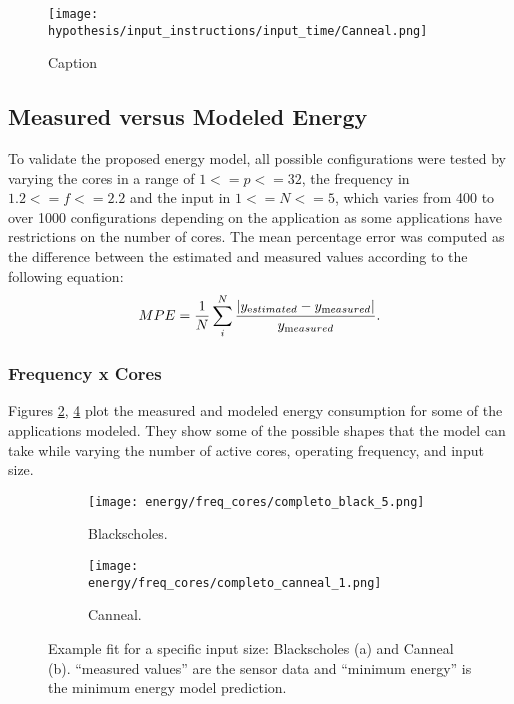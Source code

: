 \documentclass{ieeeaccess}
\begin{document}
\begin{figure}[H]
    \centering
    \texttt{[image: hypothesis/input\_instructions/input\_time/Canneal.png]}
    \caption{Caption}
    \label{fig:my_label}
\end{figure}

\subsection{Measured versus Modeled Energy}
\label{sec:measuredversusmodeledenergy}

To validate the proposed energy model, all possible configurations were tested by varying the cores in a range of $1<=p<=32$, the frequency in $1.2<=f<=2.2$ and the input in $1<=N<=5$, which varies from 400 to over 1000 configurations depending on the application as some applications have restrictions on the number of cores. The mean percentage error was computed as the difference between the estimated and measured values according to the following equation:
\begin{equation}
    MPE = \frac{1}{N} \sum_i^N \frac{|y_{\rm estimated}-y_{\rm measured}|}{y_{\rm measured}}.
    \label{eq:mpe}
\end{equation}

\subsubsection{Frequency x Cores}
Figures \ref{fig:en_eq_black}, \ref{fig:en_eq_canneal} plot the measured and modeled energy consumption for some of the applications modeled. They  show some of the possible shapes that the model can take while varying the number of active cores, operating frequency, and input size.
\begin{figure}[H]
    \centering
    \begin{subfigure}[b]{0.48\textwidth}
    	\centerline{\texttt{[image: energy/freq\_cores/completo\_black\_5.png]}}
        \caption{Blackscholes.}
    	\label{fig:en_eq_black}
    \end{subfigure}
    \begin{subfigure}[b]{0.48\textwidth}
	\centerline{\texttt{[image: energy/freq\_cores/completo\_canneal\_1.png]}}
    \caption{Canneal.}
	\label{fig:en_eq_canneal}
    \end{subfigure}
	\caption{Example fit for a specific input size: Blackscholes (a) and Canneal (b).  “measured values” are the sensor data and “minimum energy” is the minimum energy model prediction.
	}
\end{figure}
\end{document}
